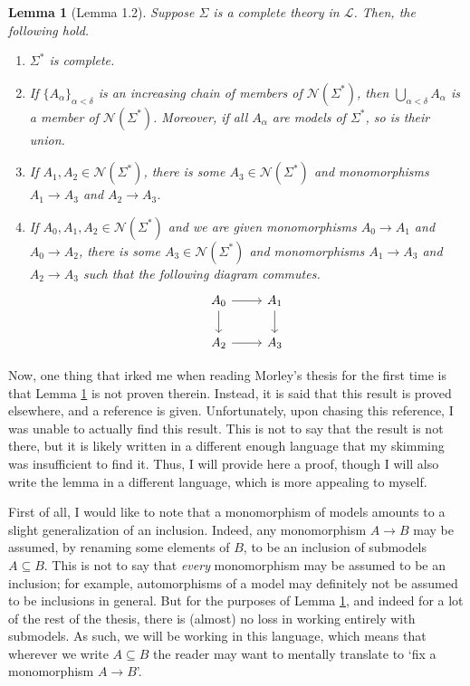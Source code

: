 \documentclass{article}
\newtheorem{lemma}[theorem]{Lemma}
\theoremstyle{nonumberplain}
\newcommand{\Lang}{\mathcal{L}}
\newcommand{\calN}{\mathcal{N}}
\begin{document}
\begin{lemma}[Lemma 1.2]\label{lem:1.2}
Suppose $\Sigma$ is a complete theory in $\Lang$. Then, the following hold.
\begin{enumerate}
\item\label{item:1.2:1} $\Sigma^*$ is complete.
\item\label{item:1.2:2} If $\{A_\alpha\}_{\alpha < \delta}$ is an increasing chain of members of $\calN(\Sigma^*)$, then $\bigcup_{\alpha < \delta} A_\alpha$ is a member of $\calN(\Sigma^*)$. Moreover, if all $A_\alpha$ are models of $\Sigma^*$, so is their union.
\item\label{item:1.2:3} If $A_1, A_2 \in \calN(\Sigma^*)$, there is some $A_3 \in \calN(\Sigma^*)$ and monomorphisms $A_1 \to A_3$ and $A_2 \to A_3$.
\item\label{item:1.2:4} If $A_0, A_1, A_2 \in \calN(\Sigma^*)$ and we are given monomorphisms $A_0 \to A_1$ and $A_0 \to A_2$, there is some $A_3 \in \calN(\Sigma^*)$ and monomorphisms $A_1 \to A_3$ and $A_2 \to A_3$ such that the following diagram commutes.
\begin{equation}
\begin{tikzcd}
A_0 \arrow[r] \arrow[d] & A_1 \arrow[d] \\
A_2 \arrow[r]           & A_3          
\end{tikzcd}
\end{equation}
\end{enumerate}
\end{lemma}

Now, one thing that irked me when reading Morley's thesis for the first time is that Lemma \ref{lem:1.2} is not proven therein. Instead, it is said that this result is proved elsewhere, and a reference is given. Unfortunately, upon chasing this reference, I was unable to actually find this result. This is not to say that the result is not there, but it is likely written in a different enough language that my skimming was insufficient to find it. Thus, I will provide here a proof, though I will also write the lemma in a different language, which is more appealing to myself.

First of all, I would like to note that a monomorphism of models amounts to a slight generalization of an inclusion. Indeed, any monomorphism $A \to B$ may be assumed, by renaming some elements of $B$, to be an inclusion of submodels $A \subseteq B$. This is not to say that \emph{every} monomorphism may be assumed to be an inclusion; for example, automorphisms of a model may definitely not be assumed to be inclusions in general. But for the purposes of Lemma \ref{lem:1.2}, and indeed for a lot of the rest of the thesis, there is (almost) no loss in working entirely with submodels. As such, we will be working in this language, which means that wherever we write $A \subseteq B$ the reader may want to mentally translate to `fix a monomorphism $A \to B$'.
\end{document}
